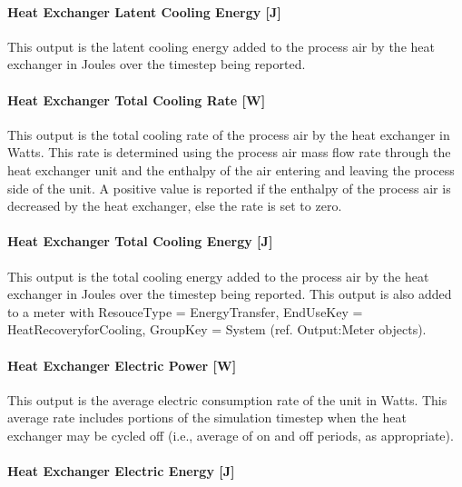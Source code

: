 \paragraph{Heat Exchanger Latent Cooling Energy {[}J{]}}\label{heat-exchanger-latent-cooling-energy-j-2}

This output is the latent cooling energy added to the process air by the heat exchanger in Joules over the timestep being reported.

\paragraph{Heat Exchanger Total Cooling Rate {[}W{]}}\label{heat-exchanger-total-cooling-rate-w-2}

This output is the total cooling rate of the process air by the heat exchanger in Watts. This rate is determined using the process air mass flow rate through the heat exchanger unit and the enthalpy of the air entering and leaving the process side of the unit. A positive value is reported if the enthalpy of the process air is decreased by the heat exchanger, else the rate is set to zero.

\paragraph{Heat Exchanger Total Cooling Energy {[}J{]}}\label{heat-exchanger-total-cooling-energy-j-2}

This output is the total cooling energy added to the process air by the heat exchanger in Joules over the timestep being reported. This output is also added to a meter with ResouceType = EnergyTransfer, EndUseKey = HeatRecoveryforCooling, GroupKey = System (ref. Output:Meter objects).

\paragraph{Heat Exchanger Electric Power {[}W{]}}\label{heat-exchanger-electric-power-w-2}

This output is the average electric consumption rate of the unit in Watts. This average rate includes portions of the simulation timestep when the heat exchanger may be cycled off (i.e., average of on and off periods, as appropriate).

\paragraph{Heat Exchanger Electric Energy {[}J{]}}\label{heat-exchanger-electric-energy-j-2}

